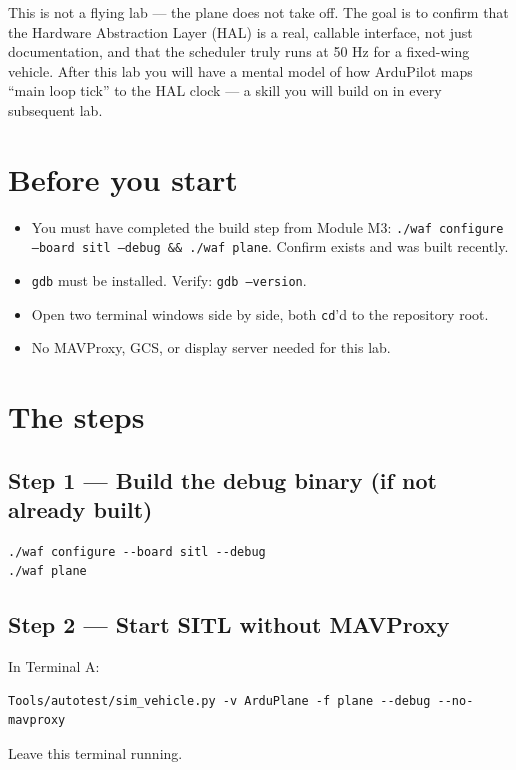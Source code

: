 \documentclass[a4paper,11pt,twoside]{article}
\begin{document}
This is not a flying lab --- the plane does not take off. The goal is to confirm that the Hardware Abstraction Layer (HAL) is a real, callable interface, not just documentation, and that the scheduler truly runs at 50 Hz for a fixed-wing vehicle. After this lab you will have a mental model of how ArduPilot maps ``main loop tick'' to the HAL clock --- a skill you will build on in every subsequent lab.

\section*{Before you start}

\begin{itemize}
  \item You must have completed the build step from Module M3: \texttt{./waf configure --board sitl --debug \&\& ./waf plane}. Confirm  exists and was built recently.
  \item \texttt{gdb} must be installed. Verify: \texttt{gdb --version}.
  \item Open two terminal windows side by side, both \texttt{cd}'d to the repository root.
  \item No MAVProxy, GCS, or display server needed for this lab.
\end{itemize}

\section*{The steps}

\subsection*{Step 1 --- Build the debug binary (if not already built)}
\begin{Verbatim}[frame=single,fontsize=\small]
./waf configure --board sitl --debug
./waf plane
\end{Verbatim}

\subsection*{Step 2 --- Start SITL without MAVProxy}
In Terminal A:
\begin{Verbatim}[frame=single,fontsize=\small]
Tools/autotest/sim_vehicle.py -v ArduPlane -f plane --debug --no-mavproxy
\end{Verbatim}
Leave this terminal running.
\end{document}
